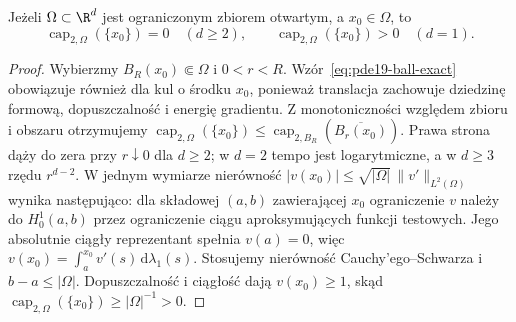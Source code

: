 \begin{wniosek}
\label{cor:pde19-point}
Jeżeli $\Omega\subset\R^d$ jest ograniczonym zbiorem otwartym,
a $x_0\in\Omega$, to
\begin{equation}\label{eq:pde19-point}
 \operatorname{cap}_{2,\Omega}(\{x_0\})=0\quad(d\ge2),
 \qquad
 \operatorname{cap}_{2,\Omega}(\{x_0\})>0\quad(d=1).
\end{equation}
\end{wniosek}
\begin{proof}
Wybierzmy $B_R(x_0)\Subset\Omega$ i $0<r<R$.
Wzór~\eqref{eq:pde19-ball-exact} obowiązuje również dla
kul o środku $x_0$, ponieważ translacja zachowuje
dziedzinę formową, dopuszczalność i energię gradientu.
Z monotoniczności
względem zbioru i obszaru otrzymujemy
$\operatorname{cap}_{2,\Omega}(\{x_0\})\le
\operatorname{cap}_{2,B_R}(\overline{B_r(x_0)})$.
Prawa strona dąży do zera przy $r\downarrow0$ dla $d\ge2$;
w $d=2$ tempo jest logarytmiczne, a w $d\ge3$ rzędu
$r^{d-2}$. W jednym wymiarze nierówność
$|v(x_0)|\le\sqrt{|\Omega|}\,\|v'\|_{L^2(\Omega)}$
wynika następująco: dla składowej $(a,b)$ zawierającej
$x_0$ ograniczenie $v$ należy do $H_0^1(a,b)$ przez
ograniczenie ciągu aproksymujących funkcji testowych.
Jego absolutnie ciągły reprezentant spełnia $v(a)=0$,
więc $v(x_0)=\int_a^{x_0}v'(s)\,\mathrm d\lambda_1(s)$.
Stosujemy nierówność Cauchy'ego--Schwarza i $b-a\le|\Omega|$.
Dopuszczalność i ciągłość dają $v(x_0)\ge1$, skąd
$\operatorname{cap}_{2,\Omega}(\{x_0\})\ge|\Omega|^{-1}>0$.
\end{proof}


